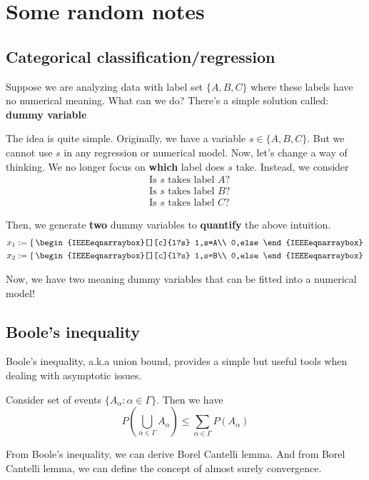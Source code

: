 \documentclass[../Probability_Theory.tex]{subfiles}
\begin{document}
\section{Some random notes}

\subsection{Categorical classification/regression}
Suppose we are analyzing data with label set $\{A,B,C\}$ where these labels have no numerical meaning. What can we do? There's a simple solution called: {\bf dummy variable}

The idea is quite simple. Originally, we have a variable $s\in\{A,B,C\}$. But we cannot use $s$ in any regression or numerical model. Now, let's change a way of thinking. We no longer focus on {\bf which } label does $s$ take. Instead, we consider
\begin{align*}
&\mbox{Is $s$ takes label $A$?}\\
&\mbox{Is $s$ takes label $B$?}\\
&\mbox{Is $s$ takes label $C$?}
\end{align*}

Then, we generate {\bf two} dummy variables to {\bf quantify} the above intuition.
\begin{align*}
&x_1:=\left\{ \,
	\begin{IEEEeqnarraybox}[][c]{l?s}
	1,s=A\\
	0,else
	\end{IEEEeqnarraybox}
	\right.\\
&x_2:=\left\{ \,
\begin{IEEEeqnarraybox}[][c]{l?s}
1,s=B\\
0,else
\end{IEEEeqnarraybox}
\right.
\end{align*}

Now, we have two meaning dummy variables that can be fitted into a numerical model!

\subsection{Boole's inequality}
Boole's inequality, a.k.a union bound, provides a simple but useful tools when dealing with asymptotic issues.
\begin{theorem}
	Consider set of events $\{A_{\alpha}:\alpha\in\Gamma\}$. Then we have
	$$P(\bigcup_{\alpha\in\Gamma}A_{\alpha})\leq\sum_{\alpha\in\Gamma}P(A_{\alpha})$$
\end{theorem}

From Boole's inequality, we can derive Borel Cantelli lemma. And from Borel Cantelli lemma, we can define the concept of almost surely convergence.
\end{document}
